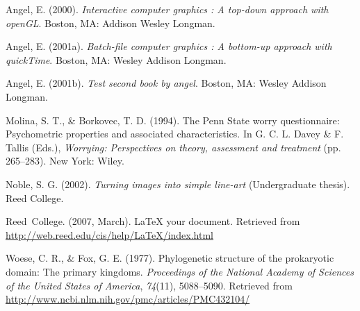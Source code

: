 \documentclass[12pt,twoside]{reedthesis}
\begin{document}
  \noindent
  
  \setlength{\parindent}{-0.20in} \setlength{\leftskip}{0.20in}
  \setlength{\parskip}{8pt}
  
  \hypertarget{refs}{}
  \hypertarget{ref-angel2000}{}
  Angel, E. (2000). \emph{Interactive computer graphics : A top-down
  approach with openGL}. Boston, MA: Addison Wesley Longman.
  
  \hypertarget{ref-angel2001}{}
  Angel, E. (2001a). \emph{Batch-file computer graphics : A bottom-up
  approach with quickTime}. Boston, MA: Wesley Addison Longman.
  
  \hypertarget{ref-angel2002a}{}
  Angel, E. (2001b). \emph{Test second book by angel}. Boston, MA: Wesley
  Addison Longman.
  
  \hypertarget{ref-Molina1994}{}
  Molina, S. T., \& Borkovec, T. D. (1994). The Penn State worry
  questionnaire: Psychometric properties and associated characteristics.
  In G. C. L. Davey \& F. Tallis (Eds.), \emph{Worrying: Perspectives on
  theory, assessment and treatment} (pp. 265--283). New York: Wiley.
  
  \hypertarget{ref-noble2002}{}
  Noble, S. G. (2002). \emph{Turning images into simple line-art}
  (Undergraduate thesis). Reed College.
  
  \hypertarget{ref-reedweb2007}{}
  Reed~College. (2007, March). LaTeX your document. Retrieved from
  \url{http://web.reed.edu/cis/help/LaTeX/index.html}
  
  \hypertarget{ref-woeseux5fphylogeneticux5f1977}{}
  Woese, C. R., \& Fox, G. E. (1977). Phylogenetic structure of the
  prokaryotic domain: The primary kingdoms. \emph{Proceedings of the
  National Academy of Sciences of the United States of America},
  \emph{74}(11), 5088--5090. Retrieved from
  \url{http://www.ncbi.nlm.nih.gov/pmc/articles/PMC432104/}


\end{document}
